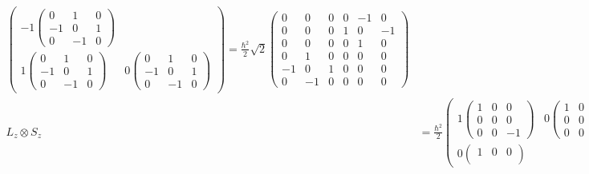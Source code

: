 \documentclass[a4paper,german,12pt,smallheadings]{scrartcl}
\begin{document}
\begin{enumerate}[a)]
\begin{align*}
\begin{pmatrix}
          -1
            \begin{pmatrix}
              0 & 1 & 0 \\
              -1 & 0 & 1 \\
              0 & -1 & 0
            \end{pmatrix}
            \\
          1
            \begin{pmatrix}
              0 & 1 & 0 \\
              -1 & 0 & 1 \\
              0 & -1 & 0
            \end{pmatrix}
           &
          0
            \begin{pmatrix}
              0 & 1 & 0 \\
              -1 & 0 & 1 \\
              0 & -1 & 0
            \end{pmatrix}
          \end{pmatrix}
          =
          \frac{\hbar^2}{2} \sqrt{2}
          \begin{pmatrix}
            0 & 0 & 0 & 0 & -1 & 0 \\
            0 & 0 & 0 & 1 & 0 & -1 \\
            0 & 0 & 0 & 0 & 1 & 0 \\
            0 & 1 & 0 & 0 & 0 & 0 \\
            -1 & 0 & 1 & 0 & 0 & 0 \\
            0 & -1 & 0 & 0 & 0 & 0
          \end{pmatrix} \\
      L_z \otimes S_z &= \frac{\hbar^2}{2}
        \begin{pmatrix}
          1
            \begin{pmatrix}
              1 & 0 & 0 \\
              0 & 0 & 0 \\
              0 & 0 & -1
            \end{pmatrix}
           &
          0
            \begin{pmatrix}
              1 & 0 & 0 \\
              0 & 0 & 0 \\
              0 & 0 & -1
            \end{pmatrix}
            \\
          0
            \begin{pmatrix}
              1 & 0 & 0 \\

\end{pmatrix}
\end{pmatrix}
\end{align*}
\end{enumerate}
\end{document}
